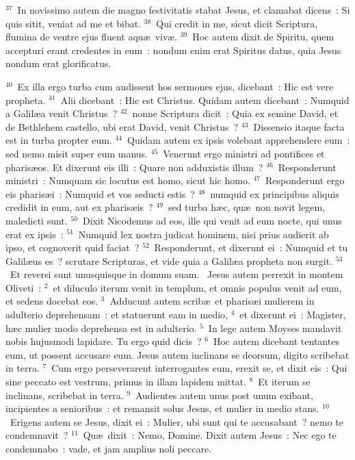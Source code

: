 ${}^{37}$~In novissimo autem die magno festivitatis stabat Jesus, et clamabat dicens~: Si quis sitit, veniat ad me et bibat.
${}^{38}$~Qui credit in me, sicut dicit Scriptura, flumina de ventre ejus fluent aqu\ae\ viv\ae .
${}^{39}$~Hoc autem dixit de Spiritu, quem accepturi erant credentes in eum~: nondum enim erat Spiritus datus, quia Jesus nondum erat glorificatus.


${}^{40}$~Ex illa ergo turba cum audissent hos sermones ejus, dicebant~: Hic est vere propheta.
${}^{41}$~Alii dicebant~: Hic est Christus. Quidam autem dicebant~: Numquid a Galil\ae a venit Christus~?
${}^{42}$~nonne Scriptura dicit~: Quia ex semine David, et de Bethlehem castello, ubi erat David, venit Christus~?
${}^{43}$~Dissensio itaque facta est in turba propter eum.
${}^{44}$~Quidam autem ex ipsis volebant apprehendere eum~: sed nemo misit super eum manus.
${}^{45}$~Venerunt ergo ministri ad pontifices et pharis\ae os. Et dixerunt eis illi~: Quare non adduxistis illum~?
${}^{46}$~Responderunt ministri~: Numquam sic locutus est homo, sicut hic homo.
${}^{47}$~Responderunt ergo eis pharis\ae i~: Numquid et vos seducti estis~?
${}^{48}$~numquid ex principibus aliquis credidit in eum, aut ex pharis\ae is~?
${}^{49}$~sed turba h\ae c, qu\ae\ non novit legem, maledicti sunt.
${}^{50}$~Dixit Nicodemus ad eos, ille qui venit ad eum nocte, qui unus erat ex ipsis~:
${}^{51}$~Numquid lex nostra judicat hominem, nisi prius audierit ab ipso, et cognoverit quid faciat~?
${}^{52}$~Responderunt, et dixerunt ei~: Numquid et tu Galil\ae us es~? scrutare Scripturas, et vide quia a Galil\ae a propheta non surgit.
${}^{53}$~Et reversi sunt unusquisque in domum suam.
~Jesus autem perrexit in montem Oliveti~:
${}^{2}$~et diluculo iterum venit in templum, et omnis populus venit ad eum, et sedens docebat eos.
${}^{3}$~Adducunt autem scrib\ae\ et pharis\ae i mulierem in adulterio deprehensam~: et statuerunt eam in medio,
${}^{4}$~et dixerunt ei~: Magister, h\ae c mulier modo deprehensa est in adulterio.
${}^{5}$~In lege autem Moyses mandavit nobis hujusmodi lapidare. Tu ergo quid dicis~?
${}^{6}$~Hoc autem dicebant tentantes eum, ut possent accusare eum. Jesus autem inclinans se deorsum, digito scribebat in terra.
${}^{7}$~Cum ergo perseverarent interrogantes eum, erexit se, et dixit eis~: Qui sine peccato est vestrum, primus in illam lapidem mittat.
${}^{8}$~Et iterum se inclinans, scribebat in terra.
${}^{9}$~Audientes autem unus post unum exibant, incipientes a senioribus~: et remansit solus Jesus, et mulier in medio stans.
${}^{10}$~Erigens autem se Jesus, dixit ei~: Mulier, ubi sunt qui te accusabant~? nemo te condemnavit~?
${}^{11}$~Qu\ae\ dixit~: Nemo, Domine. Dixit autem Jesus~: Nec ego te condemnabo~: vade, et jam amplius noli peccare.



